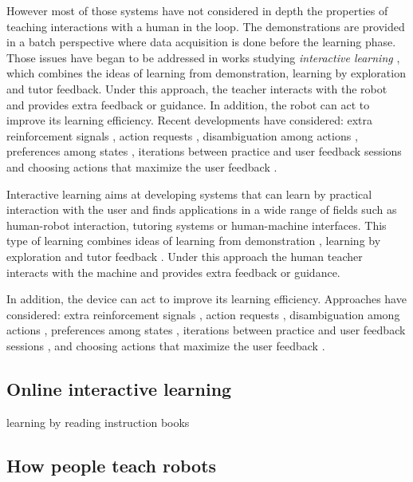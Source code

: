 However most of those systems have not considered in depth the properties of teaching interactions with a human in the loop. The demonstrations are provided in a batch perspective where data acquisition is done before the learning phase. Those issues have began to be addressed in works studying \textit{interactive learning} \cite{kaplan2002robotic,nicolescu2003natural,Breazeal2004,thomaz2008teachable}, which combines the ideas of learning from demonstration, learning by exploration and tutor feedback. Under this approach, the teacher interacts with the robot and provides extra feedback or guidance. In addition, the robot can act to improve its learning efficiency. Recent developments have considered: extra reinforcement signals \cite{thomaz2008teachable}, action requests \cite{macl09airl}, disambiguation among actions \cite{chernova09jair}, preferences among states \cite{Mason2011}, iterations between practice and user feedback sessions \cite{judah2010reinforcement} and choosing actions that maximize the user feedback \cite{knox2009interactively}.

Interactive learning \cite{nicolescu2003natural,breazeal2004tutelage} aims at developing systems that can learn by practical interaction with the user and finds applications in a wide range of fields such as human-robot interaction, tutoring systems or human-machine interfaces.
This type of learning combines ideas of learning from demonstration \cite{argall09survey}, learning by exploration \cite{thrun1992efficient} and tutor feedback \cite{kaplan2002robotic}. Under this approach the human teacher interacts with the machine and provides extra feedback or guidance. 

In addition, the device can act to improve its learning efficiency.
Approaches have considered: extra reinforcement signals \cite{thomaz2008teachable}, action requests \cite{lopes2009active}, disambiguation among actions \cite{chernova09jair}, preferences among states \cite{Mason2011}, iterations between practice and user feedback sessions \cite{judah2010reinforcement}, and choosing actions that maximize the user feedback \cite{knox2009interactively}. 

\subsection{Online interactive learning}

\cite{akgun12hri}

learning by reading instruction books


\subsection{How people teach robots}

